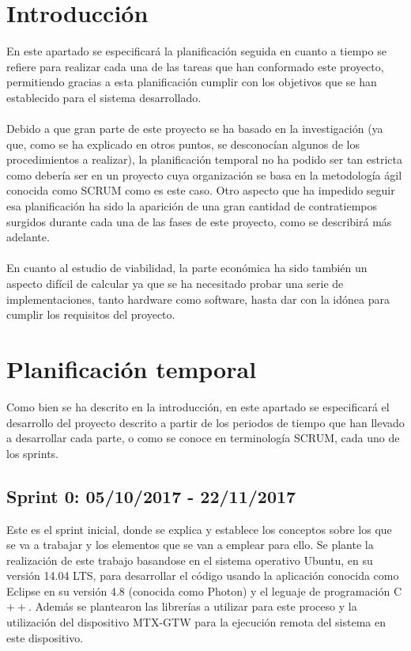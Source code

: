 
\section{Introducción}
En este apartado se especificará la planificación seguida en cuanto a tiempo se refiere para realizar cada una de las tareas que han conformado este proyecto, permitiendo gracias a esta planificación cumplir con los objetivos que se han establecido para el sistema desarrollado.\\
\\
Debido a que gran parte de este proyecto se ha basado en la investigación (ya que, como se ha explicado en otros puntos, se desconocían algunos de los procedimientos a realizar), la planificación temporal no ha podido ser tan estricta como debería ser en un proyecto cuya organización se basa en la metodología ágil conocida como SCRUM como es este caso. Otro aspecto que ha impedido seguir esa planificación ha sido la aparición de una gran cantidad de contratiempos surgidos durante cada una de las fases de este proyecto, como se describirá más adelante.\\
\\
En cuanto al estudio de viabilidad, la parte económica ha sido también un aspecto difícil de calcular ya que se ha necesitado probar una serie de implementaciones, tanto hardware como software, hasta dar con la idónea para cumplir los requisitos del proyecto.\\
 
\section{Planificación temporal}
Como bien se ha descrito en la introducción, en este apartado se especificará el desarrollo del proyecto descrito a partir de los periodos de tiempo que han llevado a desarrollar cada parte, o como se conoce en terminología SCRUM, cada uno de los sprints.\\

\subsection{Sprint 0: 05/10/2017 - 22/11/2017}
Este es el sprint inicial, donde se explica y establece los conceptos sobre los que se va a trabajar y los elementos que se van a emplear para ello. Se plante la realización de este trabajo basandose en el sistema operativo Ubuntu, en su versión 14.04 LTS, para desarrollar el código usando la aplicación conocida como Eclipse en su versión 4.8 (conocida como Photon) y el leguaje de programación C$++$. Además se plantearon las librerías a utilizar para este proceso y la utilización del dispositivo MTX-GTW para la ejecución remota del sistema en este dispositivo.\\
